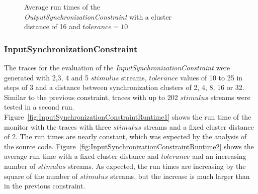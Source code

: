 \begin{figure}
\begin{minipage}{0.45\textwidth}
		\centering
		\caption{Average run times of the\\ \textit{OutputSynchronizationConstraint} with a cluster\\ distance of 16 and $tolerance=10$}
		\label{fig:OutputSynchronizationConstraintRuntime2}
	\end{minipage}\hfill
\end{figure}


\subsubsection{InputSynchronizationConstraint}
The traces for the evaluation of the \textit{InputSynchronizationConstraint} were generated with 2,3, 4 and 5 $stimulus$ streams, $tolerance$ values of 10 to 25 in steps of 3 and a distance between synchronization clusters of 2, 4, 8, 16 or 32. Similar to the previous constraint, traces with up to 202 $stimulus$ streams were tested in a second run.\\
Figure~\ref{fig:InputSynchronizationConstraintRuntime1} shows the run time of the monitor with the traces with three $stimulus$ streams and a fixed cluster distance of 2. The run times are nearly constant, which was expected by the analysis of the source code. Figure~\ref{fig:InputSynchronizationConstraintRuntime2} shows the average run time with a fixed cluster distance and $tolerance$ and an increasing number of $stimulus$ streams. As expected, the run times are increasing by the square of the number of $stimulus$ streams, but the increase is much larger than in the previous constraint.

